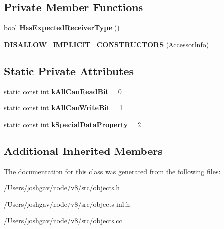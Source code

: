 \subsection*{Private Member Functions}
\begin{DoxyCompactItemize}
\item 
bool {\bfseries Has\+Expected\+Receiver\+Type} ()\hypertarget{classv8_1_1internal_1_1_accessor_info_a8ef0e04f4a3f7995cbabec338bbad4dd}{}\label{classv8_1_1internal_1_1_accessor_info_a8ef0e04f4a3f7995cbabec338bbad4dd}

\item 
{\bfseries D\+I\+S\+A\+L\+L\+O\+W\+\_\+\+I\+M\+P\+L\+I\+C\+I\+T\+\_\+\+C\+O\+N\+S\+T\+R\+U\+C\+T\+O\+RS} (\hyperlink{classv8_1_1internal_1_1_accessor_info}{Accessor\+Info})\hypertarget{classv8_1_1internal_1_1_accessor_info_af92ad1d057d3cf199ebaf4914d8de20f}{}\label{classv8_1_1internal_1_1_accessor_info_af92ad1d057d3cf199ebaf4914d8de20f}

\end{DoxyCompactItemize}
\subsection*{Static Private Attributes}
\begin{DoxyCompactItemize}
\item 
static const int {\bfseries k\+All\+Can\+Read\+Bit} = 0\hypertarget{classv8_1_1internal_1_1_accessor_info_abcb6346ebc8e1464f028d6a6fbfb0fba}{}\label{classv8_1_1internal_1_1_accessor_info_abcb6346ebc8e1464f028d6a6fbfb0fba}

\item 
static const int {\bfseries k\+All\+Can\+Write\+Bit} = 1\hypertarget{classv8_1_1internal_1_1_accessor_info_ab7995e53bd4504ec1fb63f3cb2b34f97}{}\label{classv8_1_1internal_1_1_accessor_info_ab7995e53bd4504ec1fb63f3cb2b34f97}

\item 
static const int {\bfseries k\+Special\+Data\+Property} = 2\hypertarget{classv8_1_1internal_1_1_accessor_info_a4b9610c559e59c461e19c3081555a1c0}{}\label{classv8_1_1internal_1_1_accessor_info_a4b9610c559e59c461e19c3081555a1c0}

\end{DoxyCompactItemize}
\subsection*{Additional Inherited Members}


The documentation for this class was generated from the following files\+:\begin{DoxyCompactItemize}
\item 
/\+Users/joshgav/node/v8/src/objects.\+h\item 
/\+Users/joshgav/node/v8/src/objects-\/inl.\+h\item 
/\+Users/joshgav/node/v8/src/objects.\+cc\end{DoxyCompactItemize}
